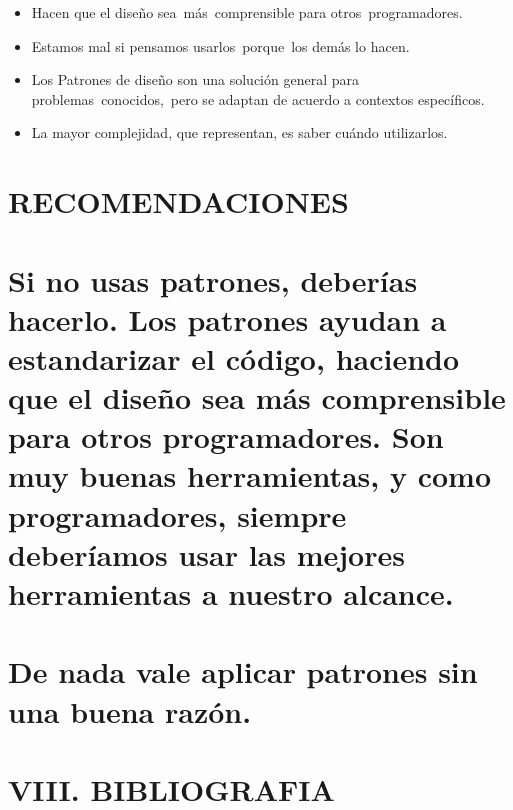 \documentclass[12pt]{article}
\begin{document}
\begin{multicols}{2}
\begin{itemize}
	\item {\fontsize{9pt}{10.8pt}\selectfont Hacen que el diseño sea más comprensible para otros programadores. \par}\par

	\item {\fontsize{9pt}{10.8pt}\selectfont Estamos mal si pensamos usarlos porque los demás lo hacen. \par}\par

	\item {\fontsize{9pt}{10.8pt}\selectfont Los Patrones de diseño son una solución general para problemas conocidos, pero se adaptan de acuerdo a contextos específicos. \par}\par

	\item {\fontsize{9pt}{10.8pt}\selectfont La mayor complejidad, que representan, es saber cuándo utilizarlos. \par}
\end{itemize}\par


\vspace{\baselineskip}
{\fontsize{9pt}{10.8pt}\selectfont  \par}\par

\section{RECOMENDACIONES}

\vspace{\baselineskip}
\vspace{\baselineskip}
\vspace{\baselineskip}\section{Si no usas patrones, deberías hacerlo. Los patrones ayudan a estandarizar el código, haciendo que el diseño sea más comprensible para otros programadores. Son muy buenas herramientas, y como programadores, siempre deberíamos usar las mejores herramientas a nuestro alcance. }
\section{De nada vale aplicar patrones sin una buena razón. }

\vspace{\baselineskip}
\vspace{\baselineskip}
\vspace{\baselineskip}\section*{VIII. BIBLIOGRAFIA}


\end{multicols}
\end{document}
